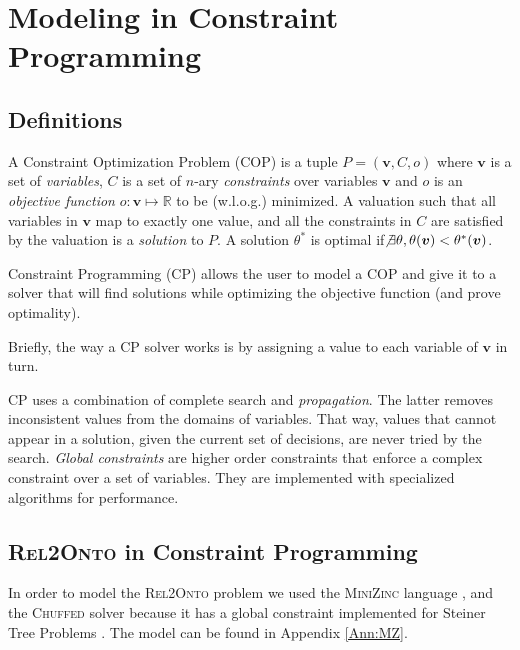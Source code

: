 \documentclass[letterpaper]{article} %
\newcommand{\minizinc}{\textsc{MiniZinc}}
\newcommand{\chuffed}{\textsc{Chuffed}}
\newcommand{\relonto}{\textsc{Rel2Onto}}
\newcommand{\ignore}[1]{}
\begin{document}
\section{Modeling in Constraint Programming \label{SEC:CP}}
\subsection{Definitions}

A Constraint Optimization Problem (COP) is a tuple $P=(\boldsymbol{v},C,o)$ 
where $\boldsymbol{v}$ is a 
set of \emph{variables}, $C$ is a set of $n$-ary 
\emph{constraints} over variables $\boldsymbol{v}$ and $o$ is an 
\emph{objective function} $o : \boldsymbol{v} \mapsto \mathbb{R}$ to be 
(w.l.o.g.) minimized. 
A valuation such that all variables in $\boldsymbol{v}$ map 
to exactly one value, and all the constraints in $C$ are satisfied by the 
valuation is a \emph{solution} to $P$. A solution $\theta^*$ is optimal if$\not 
\exists \theta, \theta(\boldsymbol{v}) < \theta^*(\boldsymbol{v})$.

Constraint Programming (CP) allows the user to model a COP and give it 
to a solver that will find solutions while optimizing 
the objective function (and prove optimality).

Briefly, the way a CP solver works is by assigning a value to each variable of 
$\boldsymbol{v}$ in turn. 
\ignore{At each iteration it will check whether any 
constraint in $C$ is violated, in which case it will backtrack to change its 
last decision. \ignore{The choice of the order of the variables to be assigned, 
and the 
choice of the value to be assigned to each variable is called the \emph{search 
strategy}.}}
CP uses a combination of complete search and \emph{propagation}. The latter
removes inconsistent values 
from the domains of variables. That way, values that cannot appear in a 
solution, given the current set of decisions, are never tried by the search. 
\emph{Global constraints} are higher order constraints that enforce a 
complex 
constraint over a set of variables. They are implemented with 
specialized algorithms for performance.


\subsection{\relonto{} in Constraint Programming}
In order to model the \relonto{} problem we used the \minizinc{} language 
\cite{minizinc}, and the 
\chuffed{} solver \cite{chu2011improving} because it has a global constraint 
implemented for Steiner 
Tree Problems \cite{deuna2016steiner}. The model can be found in Appendix \ref{Ann:MZ}.
\end{document}
